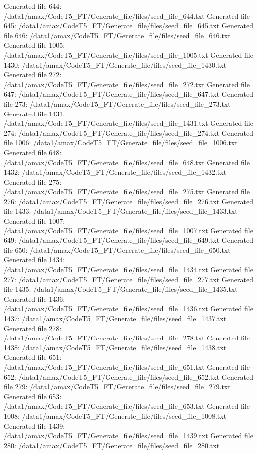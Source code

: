 Generated file 644: /data1/amax/CodeT5_FT/Generate_file/files/seed_file_644.txt
Generated file 645: /data1/amax/CodeT5_FT/Generate_file/files/seed_file_645.txt
Generated file 646: /data1/amax/CodeT5_FT/Generate_file/files/seed_file_646.txt
Generated file 1005: /data1/amax/CodeT5_FT/Generate_file/files/seed_file_1005.txt
Generated file 1430: /data1/amax/CodeT5_FT/Generate_file/files/seed_file_1430.txt
Generated file 272: /data1/amax/CodeT5_FT/Generate_file/files/seed_file_272.txt
Generated file 647: /data1/amax/CodeT5_FT/Generate_file/files/seed_file_647.txt
Generated file 273: /data1/amax/CodeT5_FT/Generate_file/files/seed_file_273.txt
Generated file 1431: /data1/amax/CodeT5_FT/Generate_file/files/seed_file_1431.txt
Generated file 274: /data1/amax/CodeT5_FT/Generate_file/files/seed_file_274.txt
Generated file 1006: /data1/amax/CodeT5_FT/Generate_file/files/seed_file_1006.txt
Generated file 648: /data1/amax/CodeT5_FT/Generate_file/files/seed_file_648.txt
Generated file 1432: /data1/amax/CodeT5_FT/Generate_file/files/seed_file_1432.txt
Generated file 275: /data1/amax/CodeT5_FT/Generate_file/files/seed_file_275.txt
Generated file 276: /data1/amax/CodeT5_FT/Generate_file/files/seed_file_276.txt
Generated file 1433: /data1/amax/CodeT5_FT/Generate_file/files/seed_file_1433.txt
Generated file 1007: /data1/amax/CodeT5_FT/Generate_file/files/seed_file_1007.txt
Generated file 649: /data1/amax/CodeT5_FT/Generate_file/files/seed_file_649.txt
Generated file 650: /data1/amax/CodeT5_FT/Generate_file/files/seed_file_650.txt
Generated file 1434: /data1/amax/CodeT5_FT/Generate_file/files/seed_file_1434.txt
Generated file 277: /data1/amax/CodeT5_FT/Generate_file/files/seed_file_277.txt
Generated file 1435: /data1/amax/CodeT5_FT/Generate_file/files/seed_file_1435.txt
Generated file 1436: /data1/amax/CodeT5_FT/Generate_file/files/seed_file_1436.txt
Generated file 1437: /data1/amax/CodeT5_FT/Generate_file/files/seed_file_1437.txt
Generated file 278: /data1/amax/CodeT5_FT/Generate_file/files/seed_file_278.txt
Generated file 1438: /data1/amax/CodeT5_FT/Generate_file/files/seed_file_1438.txt
Generated file 651: /data1/amax/CodeT5_FT/Generate_file/files/seed_file_651.txt
Generated file 652: /data1/amax/CodeT5_FT/Generate_file/files/seed_file_652.txt
Generated file 279: /data1/amax/CodeT5_FT/Generate_file/files/seed_file_279.txt
Generated file 653: /data1/amax/CodeT5_FT/Generate_file/files/seed_file_653.txt
Generated file 1008: /data1/amax/CodeT5_FT/Generate_file/files/seed_file_1008.txt
Generated file 1439: /data1/amax/CodeT5_FT/Generate_file/files/seed_file_1439.txt
Generated file 280: /data1/amax/CodeT5_FT/Generate_file/files/seed_file_280.txt
